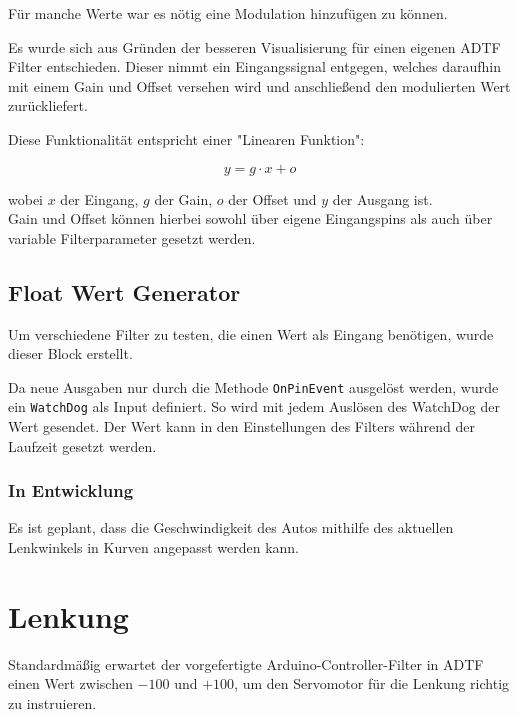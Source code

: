 \documentclass[a4paper,12pt]{report}
\begin{document}
	Für manche Werte war es nötig eine Modulation hinzufügen zu können.
	
	Es wurde sich aus Gründen der besseren Visualisierung für einen eigenen ADTF Filter entschieden.
	Dieser nimmt ein Eingangssignal entgegen, welches daraufhin mit einem Gain und Offset versehen wird und anschließend den modulierten Wert zurückliefert.
	
	Diese Funktionalität entspricht einer "Linearen Funktion":
	
	\[y = g \cdot x + o\]
	
	wobei $x$ der Eingang, $g$ der Gain, $o$ der Offset und $y$ der Ausgang ist.
	\\
	Gain und Offset können hierbei sowohl über eigene Eingangspins als auch über variable Filterparameter gesetzt werden.
	

\section{Float Wert Generator}

	Um verschiedene Filter zu testen, die einen Wert als Eingang benötigen, wurde dieser Block erstellt.

	Da neue Ausgaben nur durch die Methode \texttt{OnPinEvent} ausgelöst werden, wurde ein \texttt{WatchDog} als Input definiert. So wird mit jedem Auslösen des WatchDog der Wert gesendet. Der Wert kann in den Einstellungen des Filters während der Laufzeit gesetzt werden.


\subsection{In Entwicklung}

	Es ist geplant, dass die Geschwindigkeit des Autos mithilfe des aktuellen Lenkwinkels in Kurven angepasst werden kann.

\chapter{Lenkung}


	Standardmäßig erwartet der vorgefertigte Arduino-Controller-Filter in ADTF einen Wert zwischen $-100$ und $+100$, um den Servomotor für die Lenkung richtig zu instruieren.
	
\end{document}

